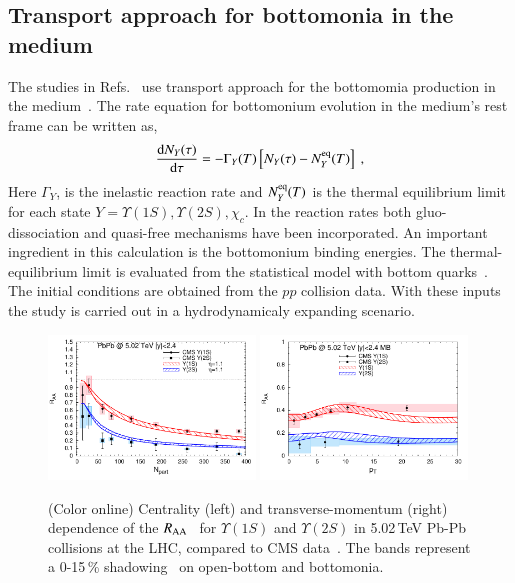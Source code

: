 {{\subsection{Transport approach for bottomonia in the medium}
 The studies in Refs.~\cite{Grandchamp:2005yw,Rapp:2017chc} use 
transport approach for the bottomomia production in the medium~\cite{Grandchamp:2005yw,Rapp:2017chc}.
The rate equation for bottomonium evolution in the medium's rest frame
can be written as,
\begin{equation}
\frac{\mathrm{d} N_Y(\tau)}{\mathrm{d}\tau} =
-\Gamma_Y(T)\left[N_Y(\tau)-N^{\rm eq}_Y(T)\right] \ ,
\end{equation}
Here $\Gamma_Y$, is the inelastic reaction rate  and $N^{\rm eq}_Y(T)$ is the thermal
equilibrium limit  for each state $Y=\Upsilon(1S), \Upsilon(2S), \chi_c$.
In the reaction rates  both gluo-dissociation and quasi-free mechanisms have
been incorporated.  An important ingredient in this calculation is the bottomonium
binding energies. The thermal-equilibrium limit is evaluated from the statistical
model with bottom quarks~\cite{Grandchamp:2002wp}. 
The initial conditions are obtained from the $pp$ collision data. With these inputs the study is carried out in a hydrodynamicaly 
expanding scenario.  




\begin{figure}[t]
\includegraphics[width=0.49\textwidth]{Figures/Fig21l_YnsRAA_NPart_RappModel.pdf}
\includegraphics[width=0.49\textwidth]{Figures/Fig21r_YnsRAA_Pt_RappModel.pdf}
\caption{(Color online) Centrality (left) and transverse-momentum (right) dependence of the $R_{\rm AA}$~\cite{Rapp:2017chc}
  for $\Upsilon(1S)$ and $\Upsilon(2S)$ in 5.02\,TeV Pb-Pb collisions at the LHC,
  compared to CMS data~\cite{Flores:2017qmcms}.
  The bands represent a 0-15\,\% shadowing~\cite{Eskola:2009uj} on open-bottom and bottomonia.}
\label{fig_cms}
\end{figure}

}}
